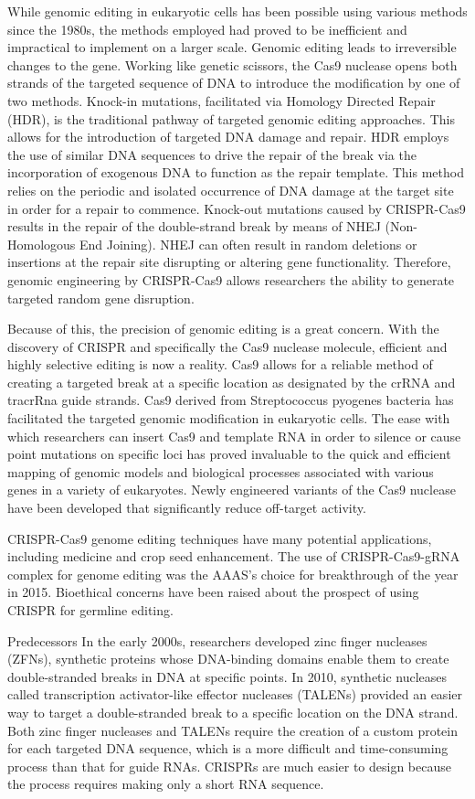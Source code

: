 While genomic editing in eukaryotic cells has been possible using various methods since the 1980s, the methods employed had proved to be inefficient and impractical to implement on a larger scale. Genomic editing leads to irreversible changes to the gene. Working like genetic scissors, the Cas9 nuclease opens both strands of the targeted sequence of DNA to introduce the modification by one of two methods. Knock-in mutations, facilitated via Homology Directed Repair (HDR), is the traditional pathway of targeted genomic editing approaches. This allows for the introduction of targeted DNA damage and repair. HDR employs the use of similar DNA sequences to drive the repair of the break via the incorporation of exogenous DNA to function as the repair template. This method relies on the periodic and isolated occurrence of DNA damage at the target site in order for a repair to commence. Knock-out mutations caused by CRISPR-Cas9 results in the repair of the double-strand break by means of NHEJ (Non-Homologous End Joining). NHEJ can often result in random deletions or insertions at the repair site disrupting or altering gene functionality. Therefore, genomic engineering by CRISPR-Cas9 allows researchers the ability to generate targeted random gene disruption.

Because of this, the precision of genomic editing is a great concern. With the discovery of CRISPR and specifically the Cas9 nuclease molecule, efficient and highly selective editing is now a reality. Cas9 allows for a reliable method of creating a targeted break at a specific location as designated by the crRNA and tracrRna guide strands. Cas9 derived from Streptococcus pyogenes bacteria has facilitated the targeted genomic modification in eukaryotic cells. The ease with which researchers can insert Cas9 and template RNA in order to silence or cause point mutations on specific loci has proved invaluable to the quick and efficient mapping of genomic models and biological processes associated with various genes in a variety of eukaryotes. Newly engineered variants of the Cas9 nuclease have been developed that significantly reduce off-target activity.

CRISPR-Cas9 genome editing techniques have many potential applications, including medicine and crop seed enhancement. The use of CRISPR-Cas9-gRNA complex for genome editing was the AAAS's choice for breakthrough of the year in 2015. Bioethical concerns have been raised about the prospect of using CRISPR for germline editing.

Predecessors
In the early 2000s, researchers developed zinc finger nucleases (ZFNs), synthetic proteins whose DNA-binding domains enable them to create double-stranded breaks in DNA at specific points. In 2010, synthetic nucleases called transcription activator-like effector nucleases (TALENs) provided an easier way to target a double-stranded break to a specific location on the DNA strand. Both zinc finger nucleases and TALENs require the creation of a custom protein for each targeted DNA sequence, which is a more difficult and time-consuming process than that for guide RNAs. CRISPRs are much easier to design because the process requires making only a short RNA sequence.

